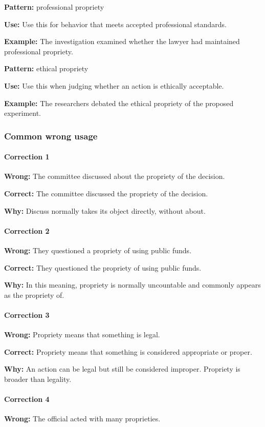 \documentclass[11pt]{article}
\begin{document}
\textbf{Pattern:} professional propriety

\textbf{Use:} Use this for behavior that meets accepted professional standards.

\textbf{Example:} The investigation examined whether the lawyer had maintained professional propriety.

\textbf{Pattern:} ethical propriety

\textbf{Use:} Use this when judging whether an action is ethically acceptable.

\textbf{Example:} The researchers debated the ethical propriety of the proposed experiment.

\subsubsection{Common wrong usage}
\paragraph{Correction 1}
\textbf{Wrong:} The committee discussed about the propriety of the decision.

\textbf{Correct:} The committee discussed the propriety of the decision.

\textbf{Why:} Discuss normally takes its object directly, without about.

\paragraph{Correction 2}
\textbf{Wrong:} They questioned a propriety of using public funds.

\textbf{Correct:} They questioned the propriety of using public funds.

\textbf{Why:} In this meaning, propriety is normally uncountable and commonly appears as the propriety of.

\paragraph{Correction 3}
\textbf{Wrong:} Propriety means that something is legal.

\textbf{Correct:} Propriety means that something is considered appropriate or proper.

\textbf{Why:} An action can be legal but still be considered improper. Propriety is broader than legality.

\paragraph{Correction 4}
\textbf{Wrong:} The official acted with many proprieties.
\end{document}
